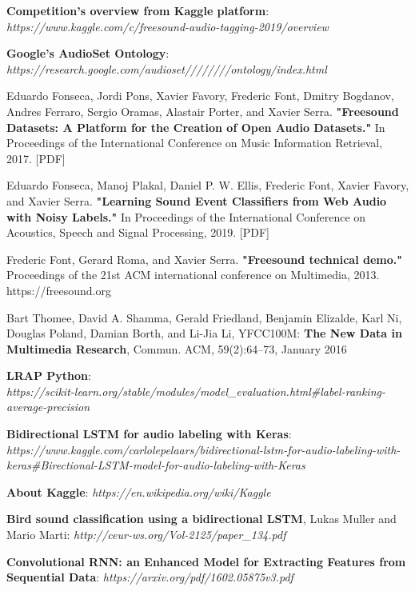 \documentclass[11pt, a4papper]{report}
\theoremstyle{plain}
\theoremstyle{definition}
\theoremstyle{definition}
\theoremstyle{proposition}
\begin{document}



\begin{thebibliography}{1}
 \textbf{Competition's overview from Kaggle platform}: \\
\textit{https://www.kaggle.com/c/freesound-audio-tagging-2019/overview}

 \textbf{Google’s AudioSet Ontology}: \textit{https://research.google.com/audioset////////ontology/index.html}

 Eduardo Fonseca, Jordi Pons, Xavier Favory, Frederic Font, Dmitry Bogdanov, Andres Ferraro, Sergio Oramas, Alastair Porter, and Xavier Serra. \textbf{"Freesound Datasets: A Platform for the Creation of Open Audio Datasets."} In Proceedings of the International Conference on Music Information Retrieval, 2017. [PDF]

 Eduardo Fonseca, Manoj Plakal, Daniel P. W. Ellis, Frederic Font, Xavier Favory, and Xavier Serra. \textbf{"Learning Sound Event Classifiers from Web Audio with Noisy Labels."} In Proceedings of the International Conference on Acoustics, Speech and Signal Processing, 2019. [PDF]

 Frederic Font, Gerard Roma, and Xavier Serra. \textbf{"Freesound technical demo."} Proceedings of the 21st ACM international conference on Multimedia, 2013. https://freesound.org

 Bart Thomee, David A. Shamma, Gerald Friedland, Benjamin Elizalde, Karl Ni, Douglas Poland, Damian Borth, and Li-Jia Li, YFCC100M: \textbf{The New Data in Multimedia Research}, Commun. ACM, 59(2):64–73, January 2016

 \textbf{LRAP Python}: \\
 \textit{https://scikit-learn.org/stable/modules/model\_evaluation.html\#label-ranking-average-precision}
 
 \textbf{Bidirectional LSTM for audio labeling with Keras}: \\
\textit{https://www.kaggle.com/carlolepelaars/bidirectional-lstm-for-audio-labeling-with-keras\#Birectional-LSTM-model-for-audio-labeling-with-Keras}

 \textbf{About Kaggle}: \textit{https://en.wikipedia.org/wiki/Kaggle}

 \textbf{Bird sound classification using a bidirectional LSTM}, Lukas Muller and Mario Marti: \textit{http://ceur-ws.org/Vol-2125/paper\_134.pdf}

 \textbf{Convolutional RNN: an Enhanced Model for Extracting Features from Sequential Data}: \textit{https://arxiv.org/pdf/1602.05875v3.pdf}
\end{thebibliography}
\end{document}
